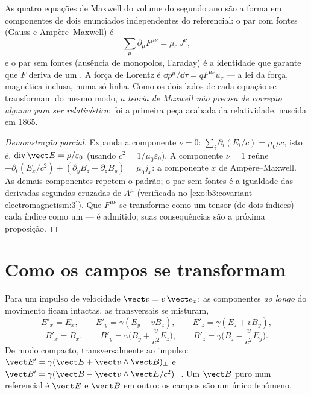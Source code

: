 \begin{theorem}\label{thm:b3:covariant-electromagnetism:maxwell}
As quatro equações de Maxwell do volume do segundo ano são a forma em
componentes de dois enunciados independentes do referencial: o par com
fontes (Gauss e Ampère--Maxwell) é
\[
\sum_\mu \partial_\mu F^{\mu\nu} = \mu_0\,J^\nu ,
\]
e o par sem fontes (ausência de monopolos, Faraday) é a identidade que
garante que $F$ deriva de um . A força de Lorentz é
$\dd p^\mu/\dd\tau = qF^{\mu\nu}u_\nu$ --- a lei da força, magnética
inclusa, numa só linha. Como os dois lados de cada equação se
transformam do mesmo modo, \emph{a teoria de Maxwell não precisa de
correção alguma para ser relativística}: foi a primeira peça acabada da
relatividade, nascida em 1865.
\end{theorem}

\begin{proof}[Demonstração parcial]
Expanda a componente $\nu = 0$: $\sum_i\partial_i(E_i/c) =
\mu_0\rho c$, isto é, $\operatorname{div}\vect E = \rho/\varepsilon_0$
(usando $c^2 = 1/\mu_0\varepsilon_0$). A componente $\nu = 1$ reúne
$-\partial_t(E_x/c^2) + (\partial_yB_z - \partial_zB_y)
= \mu_0 j_x$: a componente $x$ de Ampère--Maxwell. As demais
componentes repetem o padrão; o par sem fontes é a igualdade das
derivadas segundas cruzadas de $A^\mu$ (verificada no
\cref{exo:b3:covariant-electromagnetism:3}). Que $F^{\mu\nu}$ se
transforme como um tensor (de dois índices) --- cada índice como um
 --- é admitido; suas consequências são a próxima
proposição.
\end{proof}

\section{Como os campos se transformam}

\begin{proposition}\label{prop:b3:covariant-electromagnetism:transform}
Para um impulso de velocidade $\vect v = v\,\vect e_x$: as componentes
\emph{ao longo} do movimento ficam intactas, as transversais se
misturam,
\[
E'_x = E_x , \qquad
E'_y = \gamma(E_y - vB_z) , \qquad
E'_z = \gamma(E_z + vB_y) ,
\]
\[
B'_x = B_x , \qquad
B'_y = \gamma\Big(B_y + \frac{v}{c^2}E_z\Big) , \qquad
B'_z = \gamma\Big(B_z - \frac{v}{c^2}E_y\Big) .
\]
De modo compacto, transversalmente ao impulso: $\vect E' = \gamma(\vect E +
\vect v\wedge\vect B)_\perp$ e $\vect B' = \gamma(\vect B - \vect
v\wedge\vect E/c^2)_\perp$. Um $\vect B$ puro num referencial é $\vect
E$ e $\vect B$ em outro: os campos são um único fenômeno.
\end{proposition}
\admitted

